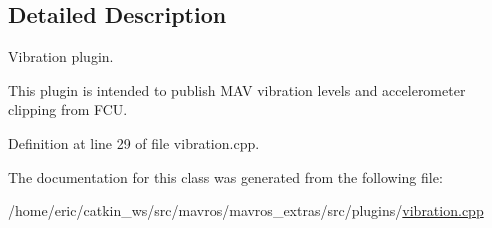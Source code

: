 \subsection{Detailed Description}
Vibration plugin. 

This plugin is intended to publish M\+AV vibration levels and accelerometer clipping from F\+CU. 

Definition at line 29 of file vibration.\+cpp.



The documentation for this class was generated from the following file\+:\begin{DoxyCompactItemize}
\item 
/home/eric/catkin\+\_\+ws/src/mavros/mavros\+\_\+extras/src/plugins/\mbox{\hyperlink{vibration_8cpp}{vibration.\+cpp}}\end{DoxyCompactItemize}
